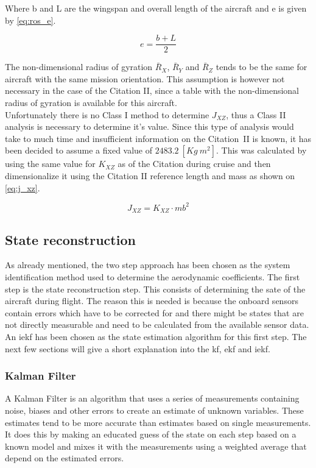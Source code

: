 Where b and L are the wingspan and overall length of the aircraft and e is given by \autoref{eq:ros_e}.

\begin{equation}
    \label{eq:ros_e}
    e = \frac{{b + L}}{2}
\end{equation}

The non-dimensional radius of gyration $\bar{R}_X$, $\bar{R}_Y$ and $\bar{R}_Z$ tends to be the same for aircraft with the same mission orientation. This assumption is however not necessary in the case of the Citation II, since a table with the non-dimensional radius of gyration is available for this aircraft.\cite{roskam_5}\\

Unfortunately there is no Class I method to determine $J_{XZ}$, thus a Class II analysis is necessary to determine it's value. Since this type of analysis would take to much time and insufficient information on the Citation~II is known, it has been decided to assume a fixed value of $2483.2\ [Kg\ m^2]$. This was calculated by using the same value for $K_{XZ}$ as of the Citation during cruise and then dimensionalize it using the Citation II reference length and mass as shown on \autoref{eq:j_xz}.

\begin{equation}
    \label{eq:j_xz}
    J_{XZ} = K_{XZ} \cdot mb^2
\end{equation}

\subsection{State reconstruction}
As already mentioned, the two step approach has been chosen as the system identification method used to determine the aerodynamic coefficients. The first step is the state reconstruction step. This consists of determining the sate of the aircraft during flight. The reason this is needed is because the onboard sensors contain errors which have to be corrected for and there might be states that are not directly measurable and need to be calculated from the available sensor data. \\

An \gls{iekf} has been chosen as the state estimation algorithm for this first step. The next few sections will give a short explanation into the \gls{kf}, \gls{ekf} and \gls{iekf}.\\

\subsubsection{Kalman Filter}
\label{sssec:kf}
A Kalman Filter is an algorithm that uses a series of measurements containing noise, biases and other errors to create an estimate of unknown variables. These estimates tend to be more accurate than estimates based on single measurements. It does this by making an educated guess of the state on each step based on a known model and mixes it with the measurements using a weighted average that depend on the estimated errors. \\

